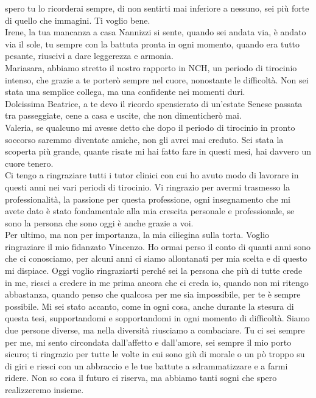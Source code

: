 spero tu lo ricorderai sempre, di non sentirti mai inferiore a nessuno, sei più forte di quello che immagini. 
Ti voglio bene.\\
Irene, la tua mancanza a casa Nannizzi si sente, quando sei andata via, è andato via il sole, tu sempre 
con la battuta pronta in ogni momento, quando era tutto pesante, riuscivi a dare leggerezza e armonia.\\
Mariasara, abbiamo stretto il nostro rapporto in NCH, un periodo di tirocinio intenso, che grazie a te porterò sempre 
nel cuore, nonostante le difficoltà. Non sei stata una semplice collega, ma una confidente nei momenti duri.\\
Dolcissima Beatrice, a te devo il ricordo spensierato di un'estate Senese passata tra passeggiate, cene a casa e 
uscite, che non dimenticherò mai.\\
Valeria, se qualcuno mi avesse detto che dopo il periodo di tirocinio in pronto soccorso saremmo diventate amiche, 
non gli avrei mai creduto. Sei stata la scoperta più grande, quante risate mi hai fatto fare in questi mesi, 
hai davvero un cuore tenero.\\
Ci tengo a ringraziare tutti i tutor clinici con cui ho avuto modo di lavorare in questi anni nei vari periodi di 
tirocinio. Vi ringrazio per avermi trasmesso la professionalità, la passione per questa professione, ogni insegnamento 
che mi avete dato è stato fondamentale alla mia crescita personale e professionale, se sono la persona che sono 
oggi è anche grazie a voi.\\
Per ultimo, ma non per importanza, la mia ciliegina sulla torta. Voglio ringraziare il mio fidanzato Vincenzo. 
Ho ormai perso il conto di quanti anni sono che ci conosciamo, per alcuni anni ci siamo allontanati per mia scelta e di 
questo mi dispiace. Oggi voglio ringraziarti 
perché sei la persona che più di tutte crede in me, riesci a credere in me prima ancora che ci creda io, quando non mi 
ritengo abbastanza, quando penso che qualcosa per me sia impossibile, per te è sempre possibile. Mi sei stato accanto, 
come in ogni cosa, anche durante la stesura di questa tesi, supportandomi e sopportandomi in ogni momento di difficoltà. 
Siamo due persone diverse, ma nella diversità riusciamo a combaciare. 
Tu ci sei sempre per me, mi sento circondata dall’affetto e dall’amore, 
sei sempre il mio porto sicuro; ti ringrazio per tutte le volte in cui sono giù di morale o un pò troppo su di 
giri e riesci con un abbraccio e le tue battute a sdrammatizzare 
e a farmi ridere. Non so cosa il futuro ci riserva, ma abbiamo tanti sogni che spero realizzeremo insieme.\\
